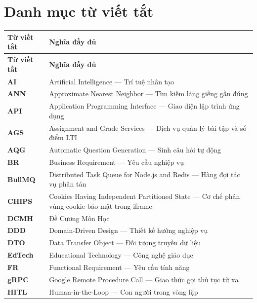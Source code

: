 \chapter*{Danh mục từ viết tắt}

\begin{longtable}{|p{3.5cm}|p{11cm}|}
    \hline
    \textbf{Từ viết tắt} & \textbf{Nghĩa đầy đủ} \\
    \hline
    \endfirsthead
    \hline
    \textbf{Từ viết tắt} & \textbf{Nghĩa đầy đủ} \\
    \hline
    \endhead

    \textbf{AI}      & Artificial Intelligence --- Trí tuệ nhân tạo \\
    \hline
    \textbf{ANN}     & Approximate Nearest Neighbor --- Tìm kiếm láng giềng gần đúng \\
    \hline
    \textbf{API}     & Application Programming Interface --- Giao diện lập trình ứng dụng \\
    \hline
    \textbf{AGS}     & Assignment and Grade Services --- Dịch vụ quản lý bài tập và sổ điểm LTI \\
    \hline
    \textbf{AQG}     & Automatic Question Generation --- Sinh câu hỏi tự động \\
    \hline
    \textbf{BR}      & Business Requirement --- Yêu cầu nghiệp vụ \\
    \hline
    \textbf{BullMQ}  & Distributed Task Queue for Node.js and Redis --- Hàng đợi tác vụ phân tán \\
    \hline
    \textbf{CHIPS}   & Cookies Having Independent Partitioned State --- Cơ chế phân vùng cookie bảo mật trong iframe \\
    \hline
    \textbf{DCMH}    & Đề Cương Môn Học \\
    \hline
    \textbf{DDD}     & Domain-Driven Design --- Thiết kế hướng nghiệp vụ \\
    \hline
    \textbf{DTO}     & Data Transfer Object --- Đối tượng truyền dữ liệu \\
    \hline
    \textbf{EdTech}  & Educational Technology --- Công nghệ giáo dục \\
    \hline
    \textbf{FR}      & Functional Requirement --- Yêu cầu tính năng \\
    \hline
    \textbf{gRPC}    & Google Remote Procedure Call --- Giao thức gọi thủ tục từ xa \\
    \hline
    \textbf{HITL}    & Human-in-the-Loop --- Con người trong vòng lặp \\

\end{longtable}
